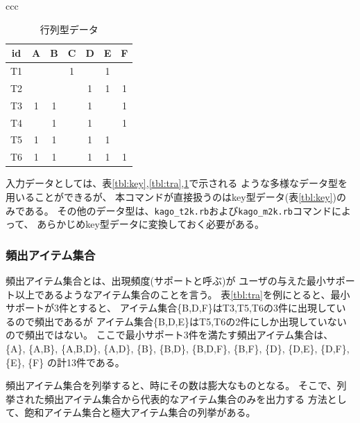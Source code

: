 \documentclass[a4paper]{jarticle}
\begin{document}
\begin{table}[htbp]
\begin{center}
\begin{tabular}{ccc}
\begin{minipage}{0.3\hsize}
\begin{center}
\caption{行列型データ\label{tbl:matrix}}
{\small
\begin{tabular}{ccccccc}
\hline
id&A&B&C&D&E&F \\
\hline
T1& & &1& &1& \\
T2& & & &1&1&1\\
T3&1&1& &1& &1\\
T4& &1& &1& &1\\
T5&1&1& &1&1& \\
T6&1&1& &1&1&1\\
\hline
\end{tabular} 
}
\end{center}
\end{minipage}

\end{tabular} 
\end{center}
\end{table} 

入力データとしては、表\ref{tbl:key},\ref{tbl:tra},\ref{tbl:matrix}で示される
ような多様なデータ型を用いることができるが、
本コマンドが直接扱うのはkey型データ(表\ref{tbl:key})のみである。
その他のデータ型は、\verb|kago_t2k.rb|および\verb|kago_m2k.rb|コマンドによって、
あらかじめkey型データに変換しておく必要がある。


\subsubsection*{頻出アイテム集合}
頻出アイテム集合とは、出現頻度(サポートと呼ぶ)が
ユーザの与えた最小サポート以上であるようなアイテム集合のことを言う。
表\ref{tbl:tra}を例にとると、最小サポートが3件とすると、
アイテム集合\{B,D,F\}はT3,T5,T6の3件に出現しているので頻出であるが
アイテム集合\{B,D,E\}はT5,T6の2件にしか出現していないので頻出ではない。
ここで最小サポート3件を満たす頻出アイテム集合は、
\{A\},
\{A,B\},
\{A,B,D\},
\{A,D\},
\{B\},
\{B,D\},
\{B,D,F\},
\{B,F\},
\{D\},
\{D,E\},
\{D,F\},
\{E\},
\{F\}
の計13件である。

頻出アイテム集合を列挙すると、時にその数は膨大なものとなる。
そこで、列挙された頻出アイテム集合から代表的なアイテム集合のみを出力する
方法として、飽和アイテム集合と極大アイテム集合の列挙がある。
\end{document}
